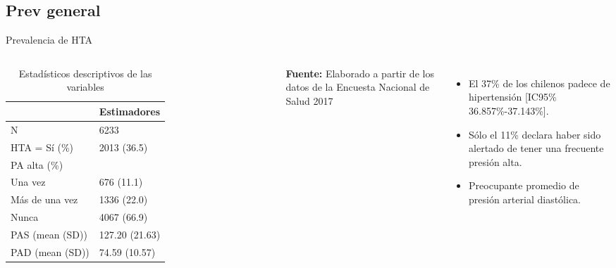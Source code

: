 \documentclass[aspectratio=169]{beamer}
\newcommand{\pro}{\item [$\blacktriangleright$]}
\begin{document}
\subsection*{Prev general}
\begin{frame}{Prevalencia de HTA}
        \begin{columns}[onlytextwidth]
\begin{table}{}
\caption{Estadísticos descriptivos de las variables}
    \centering
\begin{tabular}{l l}
\toprule
  & Estimadores \\
\midrule
N & 6233\\
HTA = Sí (\%) & 2013 (36.5)\\
PA alta (\%) & \\
\-\hspace{5mm} \small  Una vez & 676 (11.1)\\
\-\hspace{5mm} \small Más de una vez & 1336 (22.0)\\
\-\hspace{5mm} \small Nunca & 4067 (66.9)\\
PAS (mean (SD)) & 127.20 (21.63)\\
PAD (mean (SD)) & 74.59 (10.57)\\
\bottomrule
\end{tabular}
    \vspace{1ex}
    
    {\raggedright \small \textbf{Fuente:} Elaborado a partir de los datos de la Encuesta Nacional de Salud 2017 \par}
\end{table}
    \begin{itemize}
    \pro El 37\% de los chilenos padece de hipertensión [IC95\% 36.857\%-37.143\%].
    \pro Sólo el 11\% declara haber sido alertado de tener una frecuente presión alta.
    \pro Preocupante promedio de presión arterial diastólica.
    \end{itemize}
    \end{columns}
\end{frame}
\end{document}
